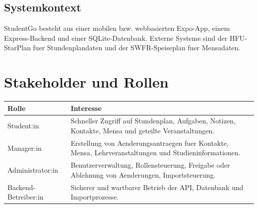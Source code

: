 \documentclass[11pt,a4paper]{article}
\newcommand{\product}{StudentGo}
\begin{document}
\subsection{Systemkontext}
\product{} besteht aus einer mobilen bzw. webbasierten Expo-App, einem Express-Backend und einer SQLite-Datenbank. Externe Systeme sind der HFU-StarPlan fuer Stundenplandaten und der SWFR-Speiseplan fuer Mensadaten.

\section{Stakeholder und Rollen}
\begin{tabularx}{\textwidth}{@{}lY@{}}
\toprule
Rolle & Interesse\\
\midrule
Student:in & Schneller Zugriff auf Stundenplan, Aufgaben, Notizen, Kontakte, Mensa und geteilte Veranstaltungen.\\
Manager:in & Erstellung von Aenderungsantraegen fuer Kontakte, Mensa, Lehrveranstaltungen und Studieninformationen.\\
Administrator:in & Benutzerverwaltung, Rollensteuerung, Freigabe oder Ablehnung von Aenderungen, Importsteuerung.\\
Backend-Betreiber:in & Sicherer und wartbarer Betrieb der API, Datenbank und Importprozesse.\\
\bottomrule
\end{tabularx}
\end{document}
